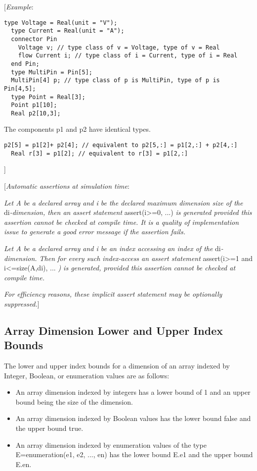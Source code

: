 {[}\emph{Example}:

\begin{lstlisting}[language=modelica]
  type Voltage = Real(unit = "V");
  type Current = Real(unit = "A");
  connector Pin
    Voltage v; // type class of v = Voltage, type of v = Real
    flow Current i; // type class of i = Current, type of i = Real
  end Pin;
  type MultiPin = Pin[5];
  MultiPin[4] p; // type class of p is MultiPin, type of p is Pin[4,5];
  type Point = Real[3];
  Point p1[10];
  Real p2[10,3];
\end{lstlisting}
  The components p1 and p2 have identical types.
\begin{lstlisting}[language=modelica]
  p2[5] = p1[2]+ p2[4]; // equivalent to p2[5,:] = p1[2,:] + p2[4,:]
  Real r[3] = p1[2]; // equivalent to r[3] = p1[2,:]
\end{lstlisting}
{]}

{[}\emph{Automatic assertions at simulation time}:

\emph{Let A be a declared array and i be the declared maximum dimension
size of the} di\emph{-dimension, then an assert statement}
assert(i\textgreater{}=0, ...) \emph{is generated provided this
assertion cannot be checked at compile time. It is a quality of
implementation issue to generate a good error message if the assertion
fails.}

\emph{Let A be a declared array and i be an index accessing an index of
the} di\emph{-dimension. Then for every such index-access an assert
statement} assert(i\textgreater{}=1 and i\textless{}=size(A,di), ...
\emph{) is generated, provided this assertion cannot be checked at
compile time.}

\emph{For efficiency reasons, these implicit assert statement may be
optionally suppressed.}{]}

\subsection{Array Dimension Lower and Upper Index Bounds}

The lower and upper index bounds for a dimension of an array indexed by
Integer, Boolean, or enumeration values are as follows:

\begin{itemize}
\item
  An array dimension indexed by integers has a lower bound of 1 and an
  upper bound being the size of the dimension.
\item
  An array dimension indexed by Boolean values has the lower bound false
  and the upper bound true.
\item
  An array dimension indexed by enumeration values of the type
  E=enumeration(e1, e2, ..., en) has the lower bound E.e1 and the upper
  bound E.en.
\end{itemize}

